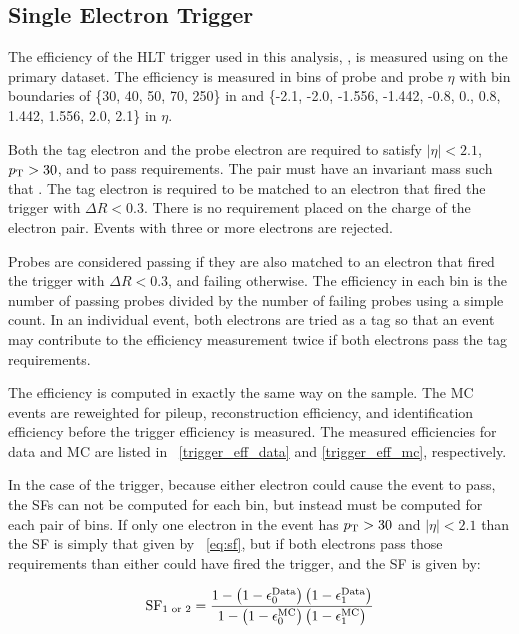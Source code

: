 \subsection{Single Electron Trigger}
\label{ssec:sf_trigger}

The efficiency of the HLT trigger used in this analysis,
\SingleElectronTrigger, is measured using \TnP on the primary dataset. The
efficiency is measured in bins of probe \pt and probe $\eta$ with bin
boundaries of \{30, 40, 50, 70, 250\} in \pt and \{-2.1, -2.0, -1.556, -1.442,
-0.8, 0., 0.8, 1.442, 1.556, 2.0, 2.1\} in $\eta$.

Both the tag electron and the probe electron are required to satisfy $|\eta| <
2.1$, $p_{\mathrm{T}} > 30$, and to pass \EGTIGHT requirements. The pair must have an
invariant mass such that \MassRange. The tag electron is required to be matched
to an electron that fired the trigger with $\Delta R < 0.3$. There is no
requirement placed on the charge of the electron pair. Events with three or
more electrons are rejected.

Probes are considered passing if they are also matched to an electron that
fired the trigger with $\Delta R < 0.3$, and failing otherwise. The efficiency
in each bin is the number of passing probes divided by the number of failing
probes using a simple count. In an individual event, both electrons are tried
as a tag so that an event may contribute to the efficiency measurement twice if
both electrons pass the tag requirements.

The efficiency is computed in exactly the same way on the \MADGRAPH sample. The
MC events are reweighted for pileup, reconstruction efficiency, and
identification efficiency before the trigger efficiency is measured. The
measured efficiencies for data and MC are listed in
\TABS~\ref{trigger_eff_data} and \ref{trigger_eff_mc}, respectively.

In the case of the trigger, because either electron could cause the event to
pass, the SFs can not be computed for each bin, but instead must be computed
for each pair of bins. If only one electron in the event has $p_{\mathrm{T}} > 30$ and
$|\eta| < 2.1$ than the SF is simply that given by \EQ~\ref{eq:sf}, but if both
electrons pass those requirements than either could have fired the trigger, and
the SF is given by:

\begin{equation} \label{eq:sf_double}
    \text{SF}_{1 \text{ or } 2}
    =
    \frac{
        1 - \left( 1 - \epsilon^{\text{Data}}_{0} \right) \left( 1 - \epsilon^{\text{Data}}_{1} \right)
    } {
        1 - \left( 1 - \epsilon^{\text{MC}}_{0} \right) \left( 1 - \epsilon^{\text{MC}}_{1} \right)
    }
\end{equation}

